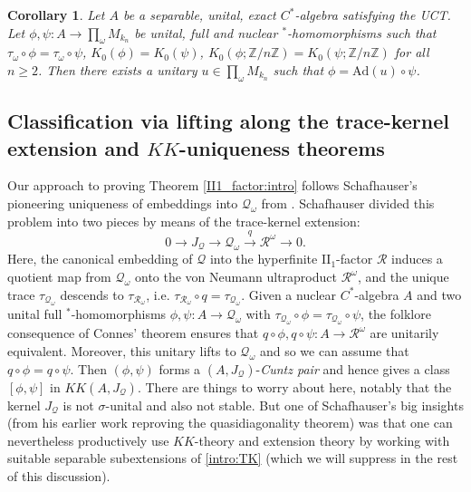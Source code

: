 \documentclass[reqno]{amsart}
\newtheorem{maincor}[mainthm]{Corollary}
\theoremstyle{definition}
\theoremstyle{remark}
\numberwithin{equation}{section}
\theoremstyle{definition}
\newcommand{\calR}{\mathcal{R}}
\newcommand{\calQ}{\mathcal{Q}}
\begin{document}
\begin{maincor}\label{quasidiagonality}\label{intro:qdcor}
Let $A$ be a separable, unital, exact $C^*$-algebra satisfying the UCT. Let $\phi, \psi: A\rightarrow \prod_{\omega} M_{k_{n}}$ be unital, full and nuclear $^*$-homomorphisms such that $\tau_{\omega} \circ \phi = \tau_{\omega} \circ \psi$, $K_0(\phi) = K_0(\psi)$, $K_0(\phi;\mathbb Z/n\mathbb Z)=K_0(\psi;\mathbb Z/n\mathbb Z)$ for all $n\geq 2$. Then there exists a unitary $u \in \prod_{\omega} M_{k_{n}}$ such that $\phi = \text{Ad} (u) \circ \psi$. 
\end{maincor} 


\subsection*{Classification via lifting along the trace-kernel extension and $KK$-uniqueness theorems} 

Our approach to proving Theorem \ref{II1_factor:intro} follows Schafhauser's pioneering uniqueness of embeddings into $\mathcal Q_\omega$ from \cite{Schafhauser.Annals}.   Schafhauser divided this problem into two pieces by means of the trace-kernel extension:
\begin{equation}\label{intro:TK}
    0\longrightarrow J_{\mathcal Q}\longrightarrow \mathcal Q_\omega\stackrel{q}{\longrightarrow} \mathcal R^\omega\longrightarrow 0.
\end{equation}
Here, the canonical embedding of $\mathcal Q$ into the hyperfinite II$_1$-factor $\mathcal R$ induces a quotient map from $\mathcal Q_\omega$ onto the von Neumann ultraproduct $\mathcal R^\omega$, and the unique trace $\tau_{\calQ_{\omega}}$ descends to $\tau_{\calR_{\omega}}$, i.e. $\tau_{\calR_{\omega}}\circ q = \tau_{\calQ_{\omega}}$.  Given a nuclear $C^*$-algebra $A$ and two unital full $^*$-homomorphisms $\phi,\psi:A\to\mathcal Q_\omega$ with $\tau_{\mathcal Q_{\omega}}\circ\phi=\tau_{\mathcal Q_{\omega}}\circ\psi$, the folklore consequence of Connes' theorem ensures that $q\circ\phi,q\circ\psi:A\to\mathcal R^\omega$ are unitarily equivalent. Moreover, this unitary lifts to $\mathcal Q_\omega$ and so we can assume that $q\circ\phi=q\circ\psi$. Then $(\phi,\psi)$ forms a $(A,J_{\mathcal Q})$-\emph{Cuntz pair} and hence gives a class $[\phi,\psi]$ in $KK(A,J_\calQ)$. There are things to worry about here, notably that the kernel $J_\calQ$ is not $\sigma$-unital and also not stable. But one of Schafhauser's big insights (from his earlier work \cite{new-TWW} reproving the quasidiagonality theorem) was that one can nevertheless productively use $KK$-theory and extension theory by working with suitable separable subextensions of \eqref{intro:TK} (which we will suppress in the rest of this discussion). 
\end{document}
